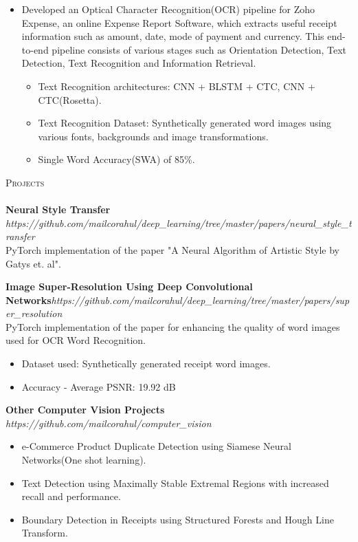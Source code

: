 \documentclass[a4paper]{article}
\newcommand{\lineunder} {
    \vspace*{-8pt} \\
    \hspace*{-18pt} \hrulefill \\
}
\newcommand{\header} [1] {
    {\hspace*{-18pt}\vspace*{6pt} \textsc{#1}}
    \vspace*{-6pt} \lineunder
}
\begin{document}
\begin{itemize}
    \itemsep-0.5em
    \item Developed an Optical Character Recognition(OCR) pipeline for Zoho Expense, an online Expense Report Software, which extracts useful receipt information such as amount, date, mode of payment and currency. This end-to-end pipeline consists of various stages such as Orientation Detection, Text Detection, Text Recognition and Information Retrieval.
    \begin{itemize}
    \item Text Recognition architectures: CNN + BLSTM + CTC, CNN + CTC(Rosetta).
    \item Text Recognition Dataset: Synthetically generated word images using various fonts, backgrounds and image transformations.
    \item Single Word Accuracy(SWA) of 85\%.
    \end{itemize}
\end{itemize}

\header{Projects}
{\textbf{Neural Style Transfer}} \hfill \textit{https://github.com/mailcorahul/deep\_learning/tree/master/papers/neural\_style\_transfer}\\
PyTorch implementation of the paper "A Neural Algorithm of Artistic Style by Gatys et. al".\\
\vspace*{2mm}

{\textbf{Image Super-Resolution Using Deep Convolutional Networks}}\hfill \textit{https://github.com/mailcorahul/deep\_learning/tree/master/papers/super\_resolution}\\
PyTorch implementation of the paper for enhancing the quality of word images used for OCR Word Recognition.\\
    \begin{itemize}
        \itemsep-0.5em
        \item Dataset used: Synthetically generated receipt word images.
        \item Accuracy - Average PSNR: 19.92 dB
    \end{itemize}

\vspace*{2mm}
{\textbf{Other Computer Vision Projects}} \\ \textit{https://github.com/mailcorahul/computer\_vision}
    \begin{itemize}
        \itemsep-0.5em
        \item e-Commerce Product Duplicate Detection using Siamese Neural Networks(One shot learning).
        \item Text Detection using Maximally Stable Extremal Regions with increased recall and performance.
        \item Boundary Detection in Receipts using Structured Forests and Hough Line Transform.\\
    \end{itemize}
\end{document}
